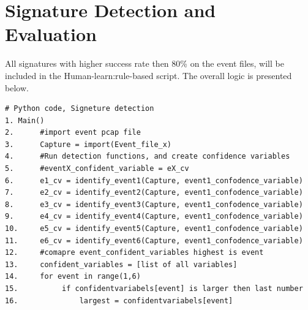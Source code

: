 \section{Signature Detection and Evaluation}
All signatures with higher success rate then 80\% on the event files, will be included in the Human-learn:rule-based script. The overall logic is presented below.
\begin{lstlisting}
# Python code, Signeture detection
1. Main()
2.      #import event pcap file
3.      Capture = import(Event_file_x)
4.      #Run detection functions, and create confidence variables
5.      #eventX_confident_variable = eX_cv  
6.      e1_cv = identify_event1(Capture, event1_confodence_variable)
7.      e2_cv = identify_event2(Capture, event1_confodence_variable)
8.      e3_cv = identify_event3(Capture, event1_confodence_variable)
9.      e4_cv = identify_event4(Capture, event1_confodence_variable)
10.     e5_cv = identify_event5(Capture, event1_confodence_variable)
11.     e6_cv = identify_event6(Capture, event1_confodence_variable)
12.     #comapre event_confident_variables highest is event
13.     confident_variables = [list of all variables]
14.     for event in range(1,6)
15.          if confidentvariabels[event] is larger then last number
16.              largest = confidentvariabels[event]  
\end{lstlisting}

